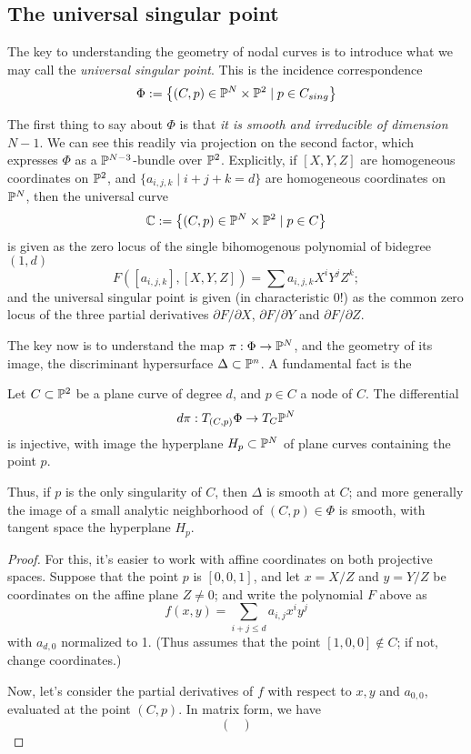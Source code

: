 \subsection{The universal singular point}

The key to understanding the geometry of nodal curves is to introduce what we may call the \emph{universal singular point}. This is the incidence correspondence
$$
\Phi := \left\{ (C, p) \in {\mathbb P}^N \times {\mathbb P}^2 \mid p \in C_{sing} \right\}
$$

The first thing to say about $\Phi$ is that \emph{it is smooth and irreducible of dimension $N-1$}. We can see this readily via projection on the second factor, which expresses $\Phi$ as a ${\mathbb P}^{N-3}$-bundle over ${\mathbb P}^2$. Explicitly, if $[X,Y,Z]$ are homogeneous coordinates on ${\mathbb P}^2$, and $\{a_{i,j,k} \mid i+j+k = d \}$ are homogeneous coordinates on ${\mathbb P}^N$, then the universal curve 
$$
{\mathbb C} := \left\{ (C, p) \in {\mathbb P}^N \times {\mathbb P}^2 \mid p \in C \right\}
$$
is given as the zero locus of the single bihomogenous polynomial of bidegree $(1, d)$
$$
F([a_{i,j,k}], [X,Y,Z] ) = \sum a_{i,j,k} X^iY^jZ^k;
$$
and the universal singular point is given (in characteristic 0!) as the common zero locus of the three partial derivatives $\partial F/\partial X$, $\partial F/\partial Y$ and  $\partial F/\partial Z$. 

The key now is to understand the map $\pi : \Phi \to {\mathbb P}^N$, and the geometry of its image, the discriminant hypersurface  $\Delta \subset {\mathbb P}^n$. A fundamental fact is the

\begin{lemma}\label{tangent space to discriminant}
Let $C \subset {\mathbb P}^2$ be a plane curve of degree $d$, and $p \in C$ a node of $C$. The differential 
$$
d\pi : T_{(C,p)}\Phi \to T_C {\mathbb P}^N
$$
is injective, with image the hyperplane $H_p \subset {\mathbb P}^N$ of plane curves containing the point $p$.
\end{lemma}

Thus, if $p$ is the only singularity of $C$, then $\Delta$ is smooth at $C$; and more generally the image of a small analytic neighborhood of $(C,p) \in \Phi$ is smooth, with tangent space the hyperplane $H_p$.

\begin{proof}
For this, it's easier to work with affine coordinates on both projective spaces. Suppose that the point $p$ is $[0,0,1]$, and let $x = X/Z$ and $y = Y/Z$ be coordinates on the affine plane $Z \neq 0$; and write the polynomial $F$ above as
$$
f(x,y) = \sum_{i+j \leq d} a_{i,j} x^iy^j
$$
with $a_{d,0}$ normalized to 1. (Thus assumes that the point $[1,0,0] \notin C$; if not, change coordinates.)

Now, let's consider the partial derivatives of $f$ with respect to $x, y$ and $a_{0,0}$, evaluated at the point $(C,p)$. In matrix form, we have
$$
\begin{pmatrix}

\end{pmatrix}
$$
\end{proof}

